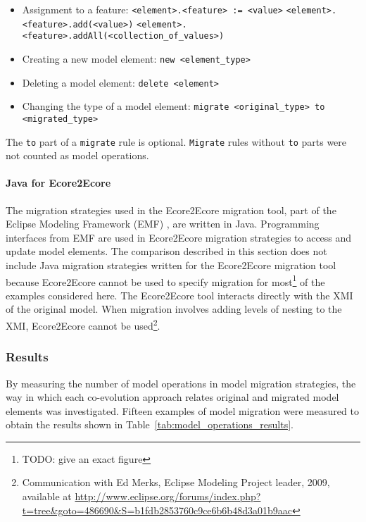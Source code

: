 \begin{itemize}
	\item Assignment to a feature:
	\subitem \texttt{<element>.<feature> := <value>} 
	\subitem \texttt{<element>.<feature>.add(<value>)}
	\subitem \texttt{<element>.<feature>.addAll(<collection\_of\_values>)}

	\item Creating a new model element:
	\subitem \texttt{new <element\_type>}
	
	\item Deleting a model element:
	\subitem \texttt{delete <element>}
	
	\item Changing the type of a model element:
	\subitem \texttt{migrate <original_type> to <migrated_type>}
\end{itemize}

The \texttt{to} part of a \texttt{migrate} rule is optional. \texttt{Migrate} rules without \texttt{to} parts were not counted as model operations.


\paragraph{Java for Ecore2Ecore}
The migration strategies used in the Ecore2Ecore migration tool, part of the Eclipse Modeling Framework (EMF) \cite{steinberg09emf}, are written in Java. Programming interfaces from EMF are used in Ecore2Ecore migration strategies to access and update model elements. The comparison described in this section does not include Java migration strategies written for the Ecore2Ecore migration tool because Ecore2Ecore cannot be used to specify migration for most\footnote{TODO: give an exact figure} of the examples considered here. The Ecore2Ecore tool interacts directly with the XMI of the original model. When migration involves adding levels of nesting to the XMI, Ecore2Ecore cannot be used\footnote{Communication with Ed Merks, Eclipse Modeling Project leader, 2009, available at \url{http://www.eclipse.org/forums/index.php?t=tree&goto=486690&S=b1fdb2853760c9ce6b6b48d3a01b9aac}}. 


\subsubsection{Results}
\label{subsec:quantitive_results}
By measuring the number of model operations in model migration strategies, the way in which each co-evolution approach relates original and migrated model elements was investigated. Fifteen examples of model migration were measured to obtain the results shown in Table~\ref{tab:model_operations_results}. 

